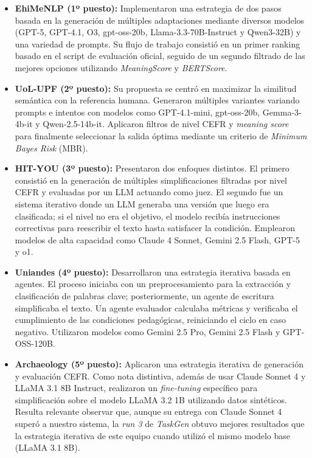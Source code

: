 \begin{itemize}
\item \textbf{EhiMeNLP \parencite{Miyata2025} (1º puesto):} Implementaron una estrategia de dos pasos basada en la generación de múltiples adaptaciones mediante diversos modelos (GPT-5, GPT-4.1, O3, gpt-oss-20b, Llama-3.3-70B-Instruct y Qwen3-32B) y una variedad de prompts. Su flujo de trabajo consistió en un primer ranking basado en el script de evaluación oficial, seguido de un segundo filtrado de las mejores opciones utilizando \textit{MeaningScore} y \textit{BERTScore}.

\item \textbf{UoL-UPF \parencite{Hayakawa2025} (2º puesto):} Su propuesta se centró en maximizar la similitud semántica con la referencia humana. Generaron múltiples variantes variando prompts e intentos con modelos como GPT-4.1-mini, gpt-oss-20b, Gemma-3-4b-it y Qwen-2.5-14b-it. Aplicaron filtros de nivel CEFR y \textit{meaning score} para finalmente seleccionar la salida óptima mediante un criterio de \textit{Minimum Bayes Risk} (MBR).

\item \textbf{HIT-YOU \parencite{Shimada2025} (3º puesto):} Presentaron dos enfoques distintos. El primero consistió en la generación de múltiples simplificaciones filtradas por nivel CEFR y evaluadas por un LLM actuando como juez. El segundo fue un sistema iterativo donde un LLM generaba una versión que luego era clasificada; si el nivel no era el objetivo, el modelo recibía instrucciones correctivas para reescribir el texto hasta satisfacer la condición. Emplearon modelos de alta capacidad como Claude 4 Sonnet, Gemini 2.5 Flash, GPT-5 y o1.

\item \textbf{Uniandes \parencite{Arias-Russi2025} (4º puesto):} Desarrollaron una estrategia iterativa basada en agentes. El proceso iniciaba con un preprocesamiento para la extracción y clasificación de palabras clave; posteriormente, un agente de escritura simplificaba el texto. Un agente evaluador calculaba métricas y verificaba el cumplimiento de las condiciones pedagógicas, reiniciando el ciclo en caso negativo. Utilizaron modelos como Gemini 2.5 Pro, Gemini 2.5 Flash y GPT-OSS-120B.

\item \textbf{Archaeology \parencite{Rocan2025} (5º puesto):} Aplicaron una estrategia iterativa de generación y evaluación CEFR. Como nota distintiva, además de usar Claude Sonnet 4 y LLaMA 3.1 8B Instruct, realizaron un \textit{fine-tuning} específico para simplificación sobre el modelo LLaMA 3.2 1B utilizando datos sintéticos. Resulta relevante observar que, aunque su entrega con Claude Sonnet 4 superó a nuestro sistema, la \textit{run 3} de \textit{TaskGen} obtuvo mejores resultados que la estrategia iterativa de este equipo cuando utilizó el mismo modelo base (LLaMA 3.1 8B).
\end{itemize}

